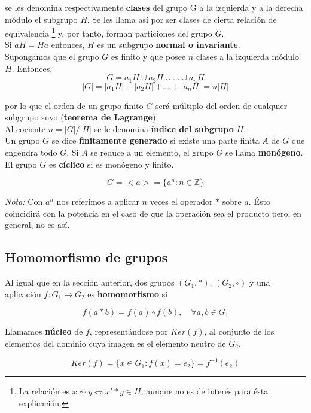 se les denomina respectivamente \textbf{clases} del grupo G a la izquierda y a la derecha módulo el subgrupo $H$. Se les llama así por ser clases de cierta relación de equivalencia \footnote{La relación es $x\sim y \Leftrightarrow x'*y \in H$, aunque no es de interés para ésta explicación.} y, por tanto, forman particiones del grupo $G$.\\

Si $aH=Ha$ entonces, $H$ es un subgrupo \textbf{normal o invariante}.\\

Supongamos que el grupo $G$ es finito y que posee $n$ clases a la izquierda módulo $H$. Entonces,
$$
G=a_1H \cup a_2H \cup \dots \cup a_nH
$$
$$
|G|=|a_1H|+|a_2H|+ \dots +|a_nH|=n|H|
$$

por lo que el orden de un grupo finito $G$ será múltiplo del orden de cualquier subgrupo suyo (\textbf{teorema de Lagrange}).\\

Al cociente $n=|G|/|H|$ se le denomina \textbf{índice del subgrupo} $H$.\\

Un grupo $G$ se dice \textbf{finitamente generado} si existe una parte finita $A$ de $G$ que engendra todo $G$. Si $A$ se reduce a un elemento, el grupo $G$ se llama \textbf{monógeno}.\\

El grupo $G$ es \textbf{cíclico} si es monógeno y finito.

$$
G=<a>=\lbrace a^n : n \in \mathbb{Z} \rbrace
$$

\emph{Nota:} Con $a^n$ nos referimos a aplicar $n$ veces el operador $*$ sobre $a$. Ésto coincidirá con la potencia en el caso de que la operación sea el producto pero, en general, no es así.

\subsection*{Homomorfismo de grupos}
Al igual que en la sección anterior, dos grupos $(G_1,*)$, $(G_2,\circ)$ y una aplicación $f:G_1 \rightarrow G_2$ es \textbf{homomorfismo} si 

$$
f(a*b)=f(a)\circ f(b), \quad \forall a,b \in G_1
$$

Llamamos \textbf{núcleo} de $f$, representándose por $Ker(f)$, al conjunto de los elementos del dominio cuya imagen es el elemento neutro de $G_2$.

$$
Ker(f)=\lbrace x\in G_1 : f(x)=e_2 \rbrace = f^{-1}(e_2)
$$

